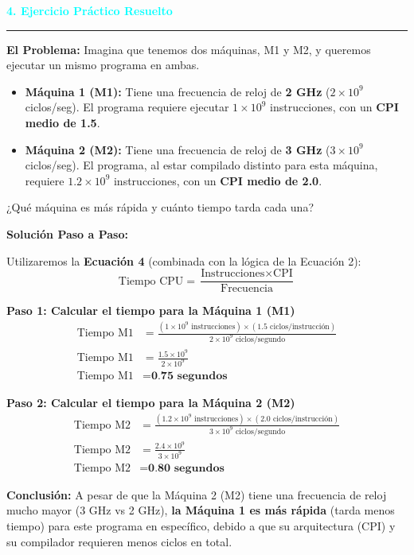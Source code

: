 \documentclass{article}
\begin{document}
\vspace{0.5cm}
\noindent\textcolor{cyan}{\Large\textbf{4. Ejercicio Práctico Resuelto}}
\vspace{0.2cm}\hrule\vspace{0.3cm}

\textbf{El Problema:}
Imagina que tenemos dos máquinas, M1 y M2, y queremos ejecutar un mismo programa en ambas.
\begin{itemize}
    \item \textbf{Máquina 1 (M1):} Tiene una frecuencia de reloj de \textbf{2 GHz} ($2 \times 10^9$ ciclos/seg). El programa requiere ejecutar $1 \times 10^9$ instrucciones, con un \textbf{CPI medio de 1.5}.
    \item \textbf{Máquina 2 (M2):} Tiene una frecuencia de reloj de \textbf{3 GHz} ($3 \times 10^9$ ciclos/seg). El programa, al estar compilado distinto para esta máquina, requiere $1.2 \times 10^9$ instrucciones, con un \textbf{CPI medio de 2.0}.
\end{itemize}
¿Qué máquina es más rápida y cuánto tiempo tarda cada una?

\vspace{0.3cm}
\textbf{Solución Paso a Paso:}

Utilizaremos la \textbf{Ecuación 4} (combinada con la lógica de la Ecuación 2):
\begin{equation*}
\text{Tiempo CPU} = \frac{\text{Instrucciones} \times \text{CPI}}{\text{Frecuencia}}
\end{equation*}

\textbf{Paso 1: Calcular el tiempo para la Máquina 1 (M1)}
\begin{align*}
\text{Tiempo M1} &= \frac{(1 \times 10^9 \text{ instrucciones}) \times (1.5 \text{ ciclos/instrucción})}{2 \times 10^9 \text{ ciclos/segundo}} \\
\text{Tiempo M1} &= \frac{1.5 \times 10^9}{2 \times 10^9} \\
\text{Tiempo M1} &= \textbf{0.75 segundos}
\end{align*}

\textbf{Paso 2: Calcular el tiempo para la Máquina 2 (M2)}
\begin{align*}
\text{Tiempo M2} &= \frac{(1.2 \times 10^9 \text{ instrucciones}) \times (2.0 \text{ ciclos/instrucción})}{3 \times 10^9 \text{ ciclos/segundo}} \\
\text{Tiempo M2} &= \frac{2.4 \times 10^9}{3 \times 10^9} \\
\text{Tiempo M2} &= \textbf{0.80 segundos}
\end{align*}

\textbf{Conclusión:}
A pesar de que la Máquina 2 (M2) tiene una frecuencia de reloj mucho mayor (3 GHz vs 2 GHz), \textbf{la Máquina 1 es más rápida} (tarda menos tiempo) para este programa en específico, debido a que su arquitectura (CPI) y su compilador requieren menos ciclos en total.
\end{document}

